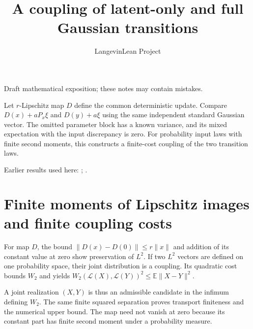\documentclass[11pt,a4paper]{article}
\title{\texorpdfstring{A coupling of latent-only and full Gaussian transitions}{A coupling of latent-only and full Gaussian transitions}}
\author{LangevinLean Project}
\date{}
\begin{document}
\maketitle
Draft mathematical exposition; these notes may contain mistakes.


Let \(r\)-Lipschitz map \(D\) define the common deterministic update. Compare \(D(x)+aP_x\xi\) and \(D(y)+a\xi\) using the same independent standard Gaussian vector. The omitted parameter block has a known variance, and its mixed expectation with the input discrepancy is zero. For probability input laws with finite second moments, this constructs a finite-cost coupling of the two transition laws.



Earlier results used here: \cite[Section~3.22]{LangevinLean2026ULASC}; \cite[Section~3.15]{LangevinLean2026ULASC}.

\section{\texorpdfstring{Finite moments of Lipschitz images and finite coupling costs}{Finite moments of Lipschitz images and finite coupling costs}}


For map \(D\), the bound \(\|D(x)-D(0)\|\le r\|x\|\) and addition of its constant value at zero show preservation of \(L^2\). If two \(L^2\) vectors are defined on one probability space, their joint distribution is a coupling. Its quadratic cost bounds \(W_2\) and yields \(W_2(\mathcal L(X),\mathcal L(Y))^2\le\mathbb E\|X-Y\|^2\).



A joint realization \((X,Y)\) is thus an admissible candidate in the infimum defining \(W_2\). The same finite squared separation proves transport finiteness and the numerical upper bound. The map need not vanish at zero because its constant part has finite second moment under a probability measure.
\end{document}

